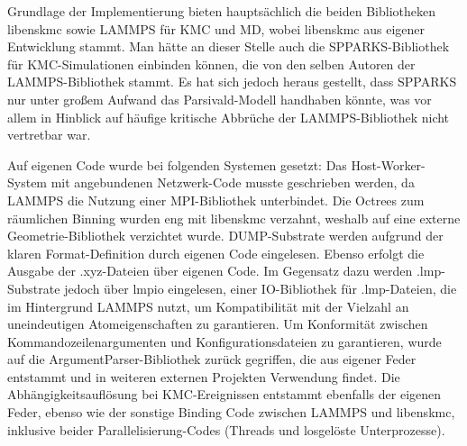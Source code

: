 Grundlage der Implementierung bieten hauptsächlich die beiden Bibliotheken libenskmc sowie LAMMPS für KMC und MD, wobei libenskmc aus eigener Entwicklung stammt.
Man hätte an dieser Stelle auch die SPPARKS-Bibliothek für KMC-Simulationen einbinden können, die von den selben Autoren der LAMMPS-Bibliothek stammt.
Es hat sich jedoch heraus gestellt, dass SPPARKS nur unter großem Aufwand das Parsivald-Modell handhaben könnte, was vor allem in Hinblick auf häufige kritische Abbrüche der LAMMPS-Bibliothek nicht vertretbar war.

Auf eigenen Code wurde bei folgenden Systemen gesetzt:
Das Host-Worker-System mit angebundenen Netzwerk-Code musste geschrieben werden, da LAMMPS die Nutzung einer MPI-Bibliothek unterbindet.
Die Octrees zum räumlichen Binning wurden eng mit libenskmc verzahnt, weshalb auf eine externe Geometrie-Bibliothek verzichtet wurde.
DUMP-Substrate werden aufgrund der klaren Format-Definition durch eigenen Code eingelesen.
Ebenso erfolgt die Ausgabe der .xyz-Dateien über eigenen Code.
Im Gegensatz dazu werden .lmp-Substrate jedoch über lmpio eingelesen, einer IO-Bibliothek für .lmp-Dateien, die im Hintergrund LAMMPS nutzt, um Kompatibilität mit der Vielzahl an uneindeutigen Atomeigenschaften zu garantieren.
Um Konformität zwischen Kommandozeilenargumenten und Konfigurationsdateien zu garantieren, wurde auf die ArgumentParser-Bibliothek zurück gegriffen, die aus eigener Feder entstammt und in weiteren externen Projekten Verwendung findet.
Die Abhängigkeitsauflösung bei KMC-Ereignissen entstammt ebenfalls der eigenen Feder, ebenso wie der sonstige Binding Code zwischen LAMMPS und libenskmc, inklusive beider Parallelisierung-Codes (Threads und losgelöste Unterprozesse).

